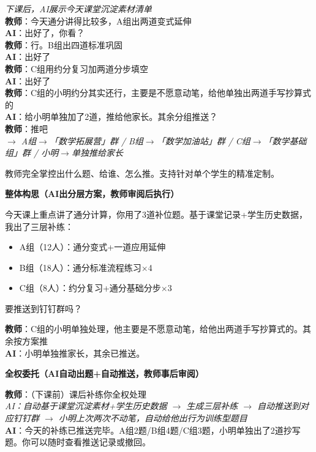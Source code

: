\documentclass[11pt,a4paper]{article}
\newcommand{\dtwo}{\ding{193}}
\newcommand{\dthree}{\ding{194}}
\begin{document}
\begin{dialogue}
\textit{下课后，AI展示今天课堂沉淀素材清单}\\[4pt]
\textbf{教师}：今天通分讲得比较多，A组出两道变式延伸\\
\textbf{AI}：出好了，你看？\\
\textbf{教师}：行。B组出四道标准巩固\\
\textbf{AI}：出好了\\
\textbf{教师}：C组用约分复习加两道分步填空\\
\textbf{AI}：出好了\\
\textbf{教师}：C组的小明约分其实还行，主要是不愿意动笔，给他单独出两道手写抄算式的\\
\textbf{AI}：给小明单独加了2道，推给他家长。其余分组推送？\\
\textbf{教师}：推吧\\
\textit{$\rightarrow$ A组$\rightarrow$「数学拓展营」群 / B组$\rightarrow$「数学加油站」群 / C组$\rightarrow$「数学基础组」群 / 小明$\rightarrow$单独推给家长}
\end{dialogue}

教师完全掌控出什么题、给谁、怎么推。支持针对单个学生的精准定制。

\bigskip
\noindent\textbf{\dtwo{} 整体构思（AI出分层方案，教师审阅后执行）}

\begin{aiplan}[课后补练方案]
今天课上重点讲了通分计算，你用了3道补位题。基于课堂记录+学生历史数据，我出了三层补练：
\begin{itemize}[leftmargin=1.5em,nosep]
  \item A组（12人）：通分变式+一道应用延伸
  \item B组（18人）：通分标准流程练习$\times$4
  \item C组（8人）：约分复习+通分基础分步$\times$3
\end{itemize}
要推送到钉钉群吗？
\end{aiplan}

\begin{dialogue}
\textbf{教师}：C组的小明单独处理，他主要是不愿意动笔，给他出两道手写抄算式的。其余按方案推\\
\textbf{AI}：小明单独推家长，其余已推送。
\end{dialogue}

\bigskip
\noindent\textbf{\dthree{} 全权委托（AI自动出题+自动推送，教师事后审阅）}

\begin{dialogue}
\textbf{教师}：（下课前）课后补练你全权处理\\[4pt]
\textit{AI：自动基于课堂沉淀素材+学生历史数据 $\rightarrow$ 生成三层补练 $\rightarrow$ 自动推送到对应钉钉群 $\rightarrow$ 小明上次两次不动笔，自动给他出行为训练型题目}\\[4pt]
\textbf{AI}：今天的补练已推送完毕。A组2题/B组4题/C组3题，小明单独出了2道抄写题。你可以随时查看推送记录或撤回。
\end{dialogue}
\end{document}
